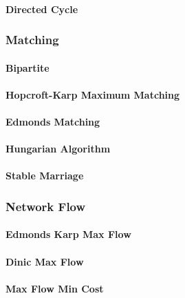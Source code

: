 \documentclass[8pt]{article}
\begin{document}
\paragraph{Directed Cycle}


\subsubsection{Matching}
\paragraph{Bipartite}

\paragraph{Hopcroft-Karp Maximum Matching}

\paragraph{Edmonds Matching}

\paragraph{Hungarian Algorithm}

\paragraph{Stable Marriage}


\subsubsection{Network Flow}
\paragraph{Edmonds Karp Max Flow}

\paragraph{Dinic Max Flow}

\paragraph{Max Flow Min Cost}

\end{document}
